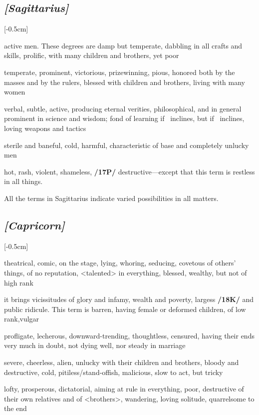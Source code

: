 \subsection{\textit{[Sagittarius]}}
\marginnote{\Sagittarius}[-0.5cm]
\vspace{-1mm}
\begin{description}[labelindent=0em , labelwidth=1em, labelsep=1em, leftmargin =!]
\item[\Jupiter]
	[0-11] active men. These degrees are damp but temperate,
dabbling in all crafts and skills, prolific, with many children and brothers, yet poor
\item[\Venus]
	[12-16] temperate, prominent, victorious, prizewinning, pious, honored both by the masses and by the rulers, blessed with children and brothers, living with many women
\item[\Mercury]
	[17-20] verbal, subtle, active, producing eternal verities, philosophical, and in general prominent in science and wisdom; fond of learning if \Mercury\, inclines, but if \Mars\, inclines, loving weapons and tactics	
\item[\Saturn]
	[21-25] sterile and baneful, cold, harmful, characteristic of base and completely unlucky men	
\item[\Mars]
	[26-29] hot, rash, violent, shameless, \textbf{/17P/} destructive—except that this term is restless in all things. 
\end{description}

\mndl[0.2cm]
All the terms in Sagittarius indicate varied possibilities in all matters.

\subsection{\textit{[Capricorn]}}
\marginnote{\Capricorn}[-0.5cm]
\vspace{-1mm}
\begin{description}[labelindent=0em , labelwidth=1em, labelsep=1em, leftmargin =!]
\item[\Mercury]
	[0-6] theatrical, comic, on the stage, lying, whoring,
seducing, covetous of others’ things, of no reputation, <talented> in everything, blessed, wealthy, but not of high rank
\item[\Jupiter]
	[7-13] it brings vicissitudes of glory and infamy, wealth and poverty,
largess \textbf{/18K/} and public ridicule. This term is barren, having female or deformed children, of low rank,vulgar
\item[\Venus]
	[14-21] profligate, lecherous, downward-trending, thoughtless, censured, having their ends very much in doubt, not dying well, nor steady in marriage
\item[\Saturn]
	[22-25] severe, cheerless, alien, unlucky with their children and brothers, bloody and destructive, cold, pitiless/stand-offish, malicious, slow to act, but tricky	
\item[\Mars]
	[26-29] lofty, prosperous, dictatorial, aiming at rule in everything, poor, destructive of their own relatives and of
<brothers>, wandering, loving solitude, quarrelsome to the end
\end{description}

